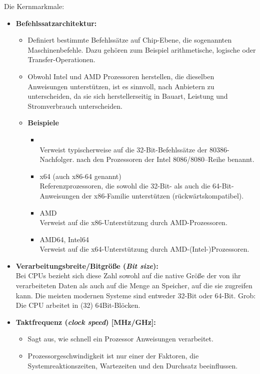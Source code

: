Die Kernmarkmale:
\begin{itemize}
	\item \textbf{Befehlssatzarchitektur:}
\begin{itemize}
	\item 	Definiert bestimmte Befehlssätze auf Chip-Ebene, die sogenannten Maschinenbefehle. Dazu gehören zum Beispiel arithmetische, logische oder Transfer-Operationen.
	\item Obwohl Intel und AMD Prozessoren herstellen, die dieselben Anweisungen unterstützen, ist es sinnvoll, nach Anbietern zu unterscheiden, da sie sich herstellerseitig in Bauart, Leistung und Stromverbrauch unterscheiden.
	\item \textbf{Beispiele}
	\begin{itemize}
		\item {}		\\
		Verweist typischerweise auf die 32-Bit-Befehlssätze der 80386-Nachfolger. nach den Prozessoren der Intel 8086/8080--Reihe benannt.
		\item	x64 (auch x86-64 genannt)\\		
		Referenzprozessoren, die sowohl die 32-Bit- als auch die 64-Bit-Anweisungen der x86-Familie unterstützen (rückwärtskompatibel).
		\item	AMD	\\	
		Verweist auf die x86-Unterstützung durch AMD-Prozessoren.
		\item	AMD64, Intel64	\\
		Verweist auf die x64-Unterstützung durch AMD-(Intel-)Prozessoren.
	\end{itemize}
\end{itemize}
	\item \textbf{Verarbeitungsbreite/Bitgröße (\textit{Bit size}):}\\
	Bei CPUs bezieht sich diese Zahl sowohl auf die native Größe der von ihr verarbeiteten Daten als auch auf die Menge an Speicher, auf die sie zugreifen kann. Die meisten modernen Systeme sind entweder 32-Bit oder 64-Bit. Grob: Die CPU arbeitet in (32) 64Bit-Blöcken.
	\item \textbf{Taktfrequenz (\textit{clock speed}) [MHz/GHz]:}
\begin{itemize}
	\item Sagt aus, wie schnell ein Prozessor Anweisungen verarbeitet. \item Prozessorgeschwindigkeit ist nur einer der Faktoren, die Systemreaktionszeiten, Wartezeiten und den Durchsatz beeinflussen.

\end{itemize}
\end{itemize}
